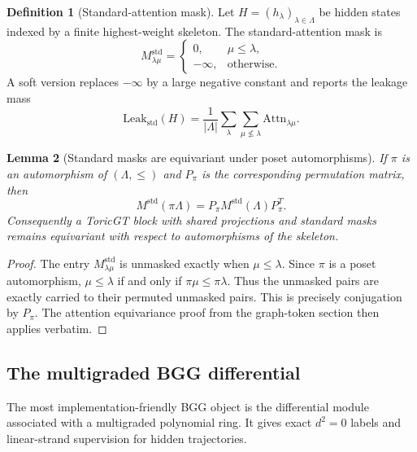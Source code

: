 \documentclass[11pt]{article}
\theoremstyle{definition}
\newtheorem{definition}{Definition}[section]
\theoremstyle{plain}
\newtheorem{lemma}[definition]{Lemma}
\theoremstyle{remark}
\numberwithin{equation}{section}
\begin{document}
\begin{definition}[Standard-attention mask]\label{def:standard-mask}
Let $H=(h_\lambda)_{\lambda\in\Lambda}$ be hidden states indexed by a finite highest-weight skeleton.  The standard-attention mask is
\begin{equation}
  M_{\lambda\mu}^{\mathrm{std}}=\begin{cases}
    0,& \mu\leq \lambda,\\
    -\infty,& \text{otherwise.}
  \end{cases}
\end{equation}
A soft version replaces $-\infty$ by a large negative constant and reports the leakage mass
\begin{equation}
  \mathrm{Leak}_{\mathrm{std}}(H)=\frac{1}{|\Lambda|}\sum_{\lambda}\sum_{\mu\not\leq\lambda}\mathrm{Attn}_{\lambda\mu}.
\end{equation}
\end{definition}

\begin{lemma}[Standard masks are equivariant under poset automorphisms]\label{lem:std-mask-equiv}
If $\pi$ is an automorphism of $(\Lambda,\leq)$ and $P_\pi$ is the corresponding permutation matrix, then
\begin{equation}
  M^{\mathrm{std}}(\pi\Lambda)=P_\pi M^{\mathrm{std}}(\Lambda)P_\pi^T.
\end{equation}
Consequently a ToricGT block with shared projections and standard masks remains equivariant with respect to automorphisms of the skeleton.
\end{lemma}

\begin{proof}
The entry $M_{\lambda\mu}^{\mathrm{std}}$ is unmasked exactly when $\mu\leq\lambda$.  Since $\pi$ is a poset automorphism, $\mu\leq\lambda$ if and only if $\pi\mu\leq\pi\lambda$.  Thus the unmasked pairs are exactly carried to their permuted unmasked pairs.  This is precisely conjugation by $P_\pi$.  The attention equivariance proof from the graph-token section then applies verbatim.
\end{proof}

\subsection{The multigraded BGG differential}

The most implementation-friendly BGG object is the differential module associated with a multigraded polynomial ring.  It gives exact $d^2=0$ labels and linear-strand supervision for hidden trajectories.
\end{document}
